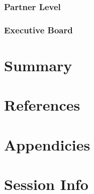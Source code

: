 \documentclass[
  11pt,
]{article}
\begin{document}
\hypertarget{partner-level}{%
\subsubsection{Partner Level}\label{partner-level}}

\hypertarget{executive-board}{%
\subsubsection{Executive Board}\label{executive-board}}

\clearpage

\hypertarget{summary}{%
\section{Summary}\label{summary}}

\clearpage

\hypertarget{references}{%
\section*{References}\label{references}}

\clearpage

\hypertarget{appendicies}{%
\section*{Appendicies}\label{appendicies}}

\clearpage

\hypertarget{session-info}{%
\section*{Session Info}\label{session-info}}
\end{document}
